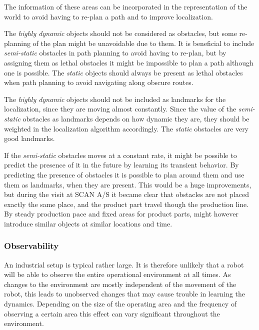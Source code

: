 The information of these areas can be incorporated in the representation of the world to avoid having to re-plan a path and to improve localization. 

The \textit{highly dynamic} objects should not be considered as obstacles, but some re-planning of the plan might be unavoidable due to them. 
It is beneficial to include \textit{semi-static} obstacles in path planning to avoid having to re-plan, but by assigning them as lethal obstacles it might be impossible to plan a path although one is possible.
The \textit{static} objects should always be present as lethal obstacles when path planning to avoid navigating along obscure routes.

The \textit{highly dynamic} objects should not be included as landmarks for the localization, since they are moving almost constantly. 
Since the value of the \textit{semi-static} obstacles as landmarks depends on how dynamic they are, they should be weighted in the localization algorithm accordingly. 
The \textit{static} obstacles are very good landmarks.

If the \textit{semi-static} obstacles moves at a constant rate, it might be possible to predict the presence of it in the future by learning its transient behavior.
By predicting the presence of obstacles it is possible to plan around them and use them as landmarks, when they are present.
This would be a huge improvements, but during the visit at SCAN A/S it became clear that obstacles are not placed exactly the same place, and the product part travel though the production line.
By steady production pace and fixed areas for product parts, might however introduce similar objects at similar locations and time.

\subsubsection{Observability}
An industrial setup is typical rather large. It is therefore unlikely that a robot will be able to observe the entire operational environment at all times. As changes to the environment are mostly independent of the movement of the robot, this leads to unobserved changes that may cause trouble in learning the dynamics. Depending on the size of the operating area and the frequency of observing a certain area this effect can vary significant throughout the environment.
